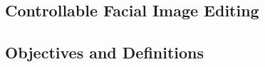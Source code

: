 \begin{spacing}{1.5}




\section{Controllable Facial Image Editing}

\subsection{Objectives and Definitions}


\end{spacing}
